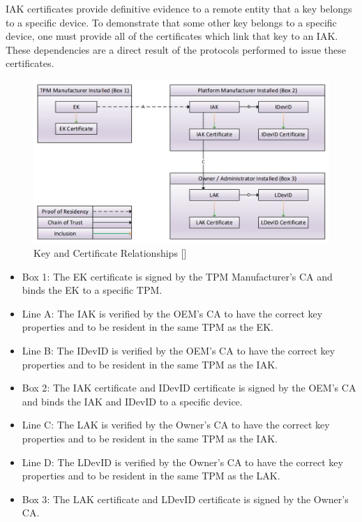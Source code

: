 IAK certificates provide definitive evidence to a remote entity that a key belongs to a specific device. To demonstrate that some other key belongs to a specific device, one must provide all of the certificates which link that key to an IAK. These dependencies are a direct result of the protocols performed to issue these certificates.
\begin{figure}[h]
  \begin{centering}
  \includegraphics[width=\linewidth]{chap_3_figures/certificateRelationships.jpg}
  \par\end{centering}
  \caption{Key and Certificate Relationships [\cite{DevIDSpec-TCG}]}
  \label{fig:cert_rel}
\end{figure}
\begin{itemize}[itemsep=0pt,parsep=0pt,partopsep=0pt]
  \item \textsf{Box 1}: The EK certificate is signed by the TPM Manufacturer's CA and binds the EK to a specific TPM.
  \item \textsf{Line A}: The IAK is verified by the OEM's CA to have the correct key properties and to be resident in the same TPM as the EK.
  \item \textsf{Line B}: The IDevID is verified by the OEM's CA to have the correct key properties and to be resident in the same TPM as the IAK.
  \item \textsf{Box 2}: The IAK certificate and IDevID certificate is signed by the OEM's CA and binds the IAK and IDevID to a specific device.
  \item \textsf{Line C}: The LAK is verified by the Owner's CA to have the correct key properties and to be resident in the same TPM as the IAK.
  \item \textsf{Line D}: The LDevID is verified by the Owner's CA to have the correct key properties and to be resident in the same TPM as the LAK.
  \item \textsf{Box 3}: The LAK certificate and LDevID certificate is signed by the Owner's CA.
\end{itemize}

